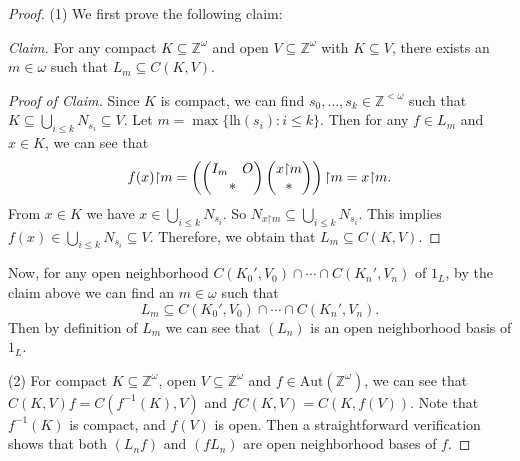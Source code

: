 \documentclass[10pt,a4paper]{amsart}
\def\Z {{\mathbb{Z}}}
\def\aut{{\mathrm{Aut}}}
\def\lh{{\mathrm{lh}}}
\renewcommand{\restriction}{\mathord{\upharpoonright}}
\begin{document}
\begin{proof}
    (1) We first prove the following claim:

{\sl Claim.} For any compact $K\subseteq\Z^\omega$ and open $V\subseteq\Z^\omega$ with $K\subseteq V$, there exists an $m\in\omega$ such that $L_m\subseteq C(K,V)$.

   \begin{proof}[Proof of Claim]
        Since $K$ is compact, we can find $s_0,\dots,s_k\in\Z^{<\omega}$ such that $K\subseteq \bigcup_{i\leq k}N_{s_i}\subseteq V$. Let $m=\max\{\lh(s_i):i\leq k\}$. Then for any $f\in L_m$ and $x\in K$, we can see that
        \begin{align*}
            f(x)\restriction m=\left(\begin{pmatrix}
                I_m & O\\
                \multicolumn{2}{c}{*}
            \end{pmatrix}\begin{pmatrix}
                x\restriction m\\
                *
            \end{pmatrix}\right)\restriction m=x\restriction m.
        \end{align*}
        From $x\in K$ we have $x\in\bigcup_{i\leq k}N_{s_i}$. So $N_{x\restriction m}\subseteq\bigcup_{i\leq k}N_{s_i}$. This implies $f(x)\in\bigcup_{i\leq k}N_{s_i}\subseteq V$. Therefore, we obtain that $L_m\subseteq C(K,V)$.
    \end{proof}

    Now, for any open neighborhood $C(K_0',V_0)\cap\cdots\cap C(K_n',V_n)$ of $1_L$, by the claim above we can find an $m\in\omega$ such that
    $$L_m\subseteq C(K_0',V_0)\cap\cdots\cap C(K_n',V_n).$$
    Then by definition of $L_m$ we can see that $(L_n)$ is an open neighborhood basis of $1_L$.

    (2) For compact $K\subseteq\Z^\omega$, open $V\subseteq\Z^\omega$ and $f\in\aut(\Z^\omega)$, we can see that $C(K,V)f=C(f^{-1}(K),V)$ and $fC(K,V)=C(K,f(V))$. Note that $f^{-1}(K)$ is compact, and $f(V)$ is open. Then a straightforward verification shows that both $(L_nf)$ and $(fL_n)$ are open neighborhood bases of $f$.


\end{proof}
\end{document}
